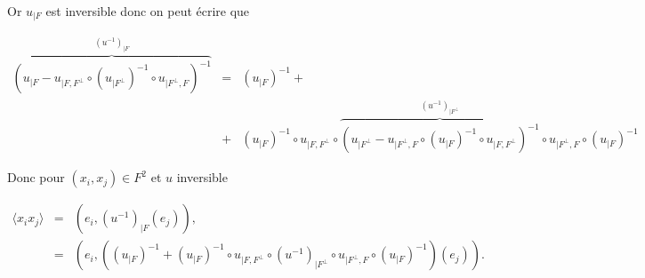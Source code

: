 \begin{aff}
	


Or $u_{\vert F }$ est inversible donc on peut écrire que 

\begin{eqnarray*}
	   \overbrace{\left ( u_{\vert F }- u_{\vert F, F^\perp} \circ (u_{\vert F^\perp})^{-1} \circ u_{\vert F^\perp, F} \right )^{-1}}^{\left (u^{-1} \right )_{\vert F}} & = & 	 \left (u_{\vert F }\right )^{-1}  + \\
	   &   + & \left (u_{\vert F }\right )^{-1} \circ u_{\vert F , F^\perp }\circ \overbrace{ \left ( u_{\vert F^\perp } - u_{\vert F^\perp , F } \circ  \left (u_{\vert F }\right )^{-1} \circ u_{\vert F , F^\perp  } \right )^{-1} }^{ \left (u^{-1} \right )_{\vert F^\perp } }	 \circ u_{\vert F^\perp , F } \circ  \left (u_{\vert F }\right )^{-1}
\end{eqnarray*}

Donc pour $(x_i , x_j)\in F^2$ et $u$ inversible 

\begin{eqnarray*}
	\langle x_i x_j \rangle  & = & \left ( e_i ,\left (u^{-1} \right )_{\vert F}  \left (e_j\right ) \right ),\\
	& = &  \left ( e_i ,\left ( \left (u_{\vert F }\right )^{-1} +  \left (u_{\vert F }\right )^{-1} \circ u_{\vert F , F^\perp }\circ  \left (u^{-1} \right )_{\vert F^\perp } 	 \circ u_{\vert F^\perp , F } \circ  \left (u_{\vert F }\right )^{-1}\right ) \left (e_j\right ) \right  ).	
\end{eqnarray*}






\end{aff}

